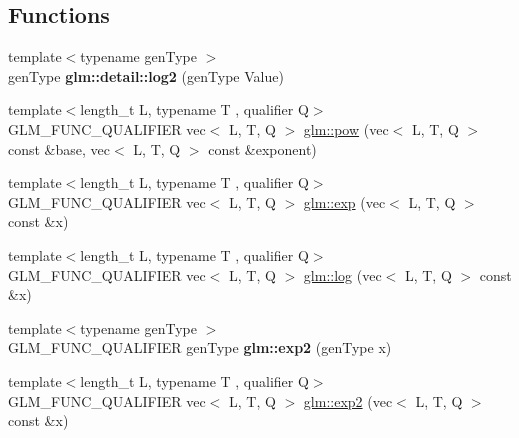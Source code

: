 \subsection*{Functions}
\begin{DoxyCompactItemize}
\item 
\mbox{\label{func__exponential_8inl_a3d24a612f2c5fa4f3aaf97dcd979ef1c}} 
{\footnotesize template$<$typename gen\+Type $>$ }\\gen\+Type {\bfseries glm\+::detail\+::log2} (gen\+Type Value)
\item 
{\footnotesize template$<$length\+\_\+t L, typename T , qualifier Q$>$ }\\G\+L\+M\+\_\+\+F\+U\+N\+C\+\_\+\+Q\+U\+A\+L\+I\+F\+I\+ER vec$<$ L, T, Q $>$ \hyperlink{group__core__func__exponential_ga2254981952d4f333b900a6bf5167a6c4}{glm\+::pow} (vec$<$ L, T, Q $>$ const \&base, vec$<$ L, T, Q $>$ const \&exponent)
\item 
{\footnotesize template$<$length\+\_\+t L, typename T , qualifier Q$>$ }\\G\+L\+M\+\_\+\+F\+U\+N\+C\+\_\+\+Q\+U\+A\+L\+I\+F\+I\+ER vec$<$ L, T, Q $>$ \hyperlink{group__core__func__exponential_ga071566cadc7505455e611f2a0353f4d4}{glm\+::exp} (vec$<$ L, T, Q $>$ const \&x)
\item 
{\footnotesize template$<$length\+\_\+t L, typename T , qualifier Q$>$ }\\G\+L\+M\+\_\+\+F\+U\+N\+C\+\_\+\+Q\+U\+A\+L\+I\+F\+I\+ER vec$<$ L, T, Q $>$ \hyperlink{group__core__func__exponential_ga918c9f3fd086ce20e6760c903bd30fa9}{glm\+::log} (vec$<$ L, T, Q $>$ const \&x)
\item 
\mbox{\label{func__exponential_8inl_a8f6240c6756f850537398b1af2751c4b}} 
{\footnotesize template$<$typename gen\+Type $>$ }\\G\+L\+M\+\_\+\+F\+U\+N\+C\+\_\+\+Q\+U\+A\+L\+I\+F\+I\+ER gen\+Type {\bfseries glm\+::exp2} (gen\+Type x)
\item 
{\footnotesize template$<$length\+\_\+t L, typename T , qualifier Q$>$ }\\G\+L\+M\+\_\+\+F\+U\+N\+C\+\_\+\+Q\+U\+A\+L\+I\+F\+I\+ER vec$<$ L, T, Q $>$ \hyperlink{group__core__func__exponential_gaff17ace6b579a03bf223ed4d1ed2cd16}{glm\+::exp2} (vec$<$ L, T, Q $>$ const \&x)
\item 
\mbox{\label{func__exponential_8inl_ab47f0f29ead9cefd62d62ba5f83fe81b}} 

\end{DoxyCompactItemize}
